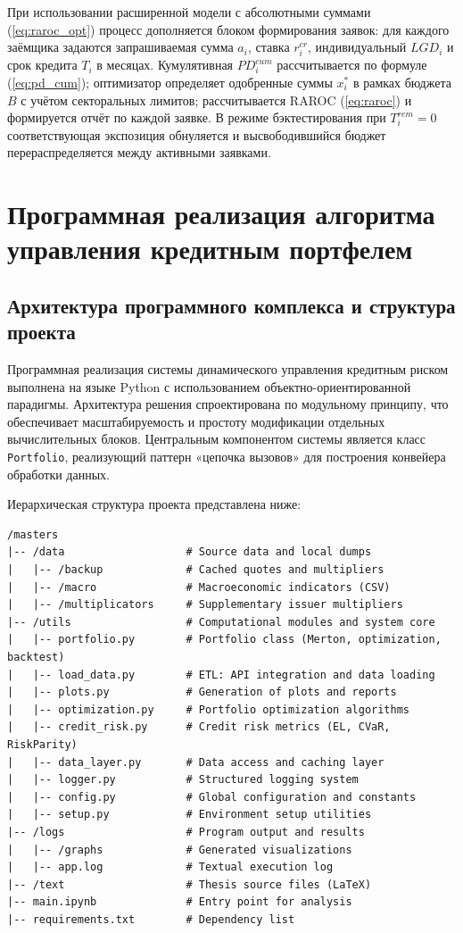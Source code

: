 \documentclass[]{article}
\begin{document}
	При использовании расширенной модели с абсолютными суммами (\ref{eq:raroc_opt}) процесс
	дополняется блоком формирования заявок: для каждого заёмщика задаются запрашиваемая
	сумма $a_i$, ставка $r_i^{cr}$, индивидуальный $LGD_i$ и срок кредита $T_i$ в месяцах.
	Кумулятивная $PD_i^{cum}$ рассчитывается по формуле (\ref{eq:pd_cum}); оптимизатор определяет
	одобренные суммы $x_i^*$ в рамках бюджета $B$ с учётом секторальных лимитов; рассчитывается
	RAROC (\ref{eq:raroc}) и формируется отчёт по каждой заявке. В режиме бэктестирования при
	$T_i^{rem} = 0$ соответствующая экспозиция обнуляется и высвободившийся бюджет
	перераспределяется между активными заявками.

	\newpage
	\section{Программная реализация алгоритма управления кредитным портфелем}

	\subsection{Архитектура программного комплекса и структура проекта}

	Программная реализация системы динамического управления кредитным риском выполнена на языке Python с использованием
	объектно-ориентированной парадигмы. Архитектура решения спроектирована по модульному принципу, что обеспечивает
	масштабируемость и простоту модификации отдельных вычислительных блоков. Центральным компонентом системы является
	класс \texttt{Portfolio}, реализующий паттерн «цепочка вызовов» для построения конвейера
	обработки данных.

	Иерархическая структура проекта представлена ниже:

\begin{lstlisting}[style=treestyle, caption={Структура директорий проекта}]
/masters
|-- /data                   # Source data and local dumps
|   |-- /backup             # Cached quotes and multipliers
|   |-- /macro              # Macroeconomic indicators (CSV)
|   |-- /multiplicators     # Supplementary issuer multipliers
|-- /utils                  # Computational modules and system core
|   |-- portfolio.py        # Portfolio class (Merton, optimization, backtest)
|   |-- load_data.py        # ETL: API integration and data loading
|   |-- plots.py            # Generation of plots and reports
|   |-- optimization.py     # Portfolio optimization algorithms
|   |-- credit_risk.py      # Credit risk metrics (EL, CVaR, RiskParity)
|   |-- data_layer.py       # Data access and caching layer
|   |-- logger.py           # Structured logging system
|   |-- config.py           # Global configuration and constants
|   |-- setup.py            # Environment setup utilities
|-- /logs                   # Program output and results
|   |-- /graphs             # Generated visualizations
|   |-- app.log             # Textual execution log
|-- /text                   # Thesis source files (LaTeX)
|-- main.ipynb              # Entry point for analysis
|-- requirements.txt        # Dependency list
\end{lstlisting}
\end{document}

